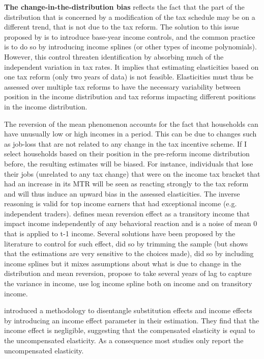  \textbf{The change-in-the-distribution bias} reflects the fact that the part of the distribution that is concerned by a modification of the tax schedule may be on a different trend, that is not due to the tax reform. The solution to this issue proposed by \citet{auten1999effect} is to introduce base-year income controls, and the common practice is to do so by introducing income splines (or other types of income polynomials). However, this control threaten identification by absorbing much of the independent variation in tax rates. It implies that estimating elasticities based on one tax reform (only two years of data) is not feasible. Elasticities must thus be assessed over multiple tax reforms to have the necessary variability between position in the income distribution and tax reforms impacting different positions in the income distribution.


The reversion of the mean phenomenon accounts for the fact that households can have unusually low or high incomes in a period. This can be due to changes such as job-loss that are not related to any change in the tax incentive scheme. If I select households based on their position in the pre-reform income distribution before, the resulting estimates will be biased. For instance, individuals that lose their jobs (unrelated to any tax change) that were on the income tax bracket that had an increase in its MTR will be seen as reacting strongly to the tax reform and will thus induce an upward bias in the assessed elasticities. The inverse reasoning is valid for top income earners that had exceptional income (e.g. independent traders). \cite{weber2014toward} defines mean reversion effect as a transitory income that impact income independently of any behavioral reaction and is a noise of mean 0 that is applied to t-1 income. Several solutions have been proposed by the literature to control for such effect, \citet{auten1999effect} did so by trimming the sample (but \citet{kopczuk2005tax} shows that the estimations are very sensitive to the choices made), \citet{gruber2002elasticity} did so by including income splines but it mixes assumptions about what is due to change in the distribution and mean reversion, \citet{weber2014toward} propose to take several years of lag to capture the variance in income, \citet{kopczuk2005tax} use log income spline both on income and on transitory income.

\citet{gruber2002elasticity} introduced a methodology to disentangle substitution effects and income effects by introducing an income effect parameter in their estimation. They find that the income effect is negligible, suggesting that the compensated elasticity is equal to the uncompensated elasticity. As a consequence most studies only report the uncompensated elasticity.


